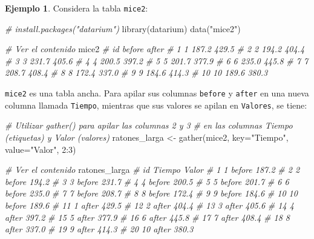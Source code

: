 \documentclass[
]{article}
\newenvironment{Shaded}{\begin{snugshade}}{\end{snugshade}}
\newcommand{\AttributeTok}[1]{\textcolor[rgb]{0.77,0.63,0.00}{#1}}
\newcommand{\CommentTok}[1]{\textcolor[rgb]{0.56,0.35,0.01}{\textit{#1}}}
\newcommand{\DecValTok}[1]{\textcolor[rgb]{0.00,0.00,0.81}{#1}}
\newcommand{\FunctionTok}[1]{\textcolor[rgb]{0.00,0.00,0.00}{#1}}
\newcommand{\NormalTok}[1]{#1}
\newcommand{\OtherTok}[1]{\textcolor[rgb]{0.56,0.35,0.01}{#1}}
\newcommand{\SpecialCharTok}[1]{\textcolor[rgb]{0.00,0.00,0.00}{#1}}
\newcommand{\StringTok}[1]{\textcolor[rgb]{0.31,0.60,0.02}{#1}}
\theoremstyle{definition}
\theoremstyle{definition}
\newtheorem{example}{Ejemplo}[section]
\theoremstyle{definition}
\theoremstyle{definition}
\theoremstyle{remark}
\begin{document}
\begin{example}

Considera la tabla \texttt{mice2}:

\begin{Shaded}
\begin{Highlighting}[]
\CommentTok{\# install.packages("datarium")}
\FunctionTok{library}\NormalTok{(datarium)}
\FunctionTok{data}\NormalTok{(}\StringTok{"mice2"}\NormalTok{)}

\CommentTok{\# Ver el contenido}
\NormalTok{mice2}
\CommentTok{\#    id before after}
\CommentTok{\# 1   1  187.2 429.5}
\CommentTok{\# 2   2  194.2 404.4}
\CommentTok{\# 3   3  231.7 405.6}
\CommentTok{\# 4   4  200.5 397.2}
\CommentTok{\# 5   5  201.7 377.9}
\CommentTok{\# 6   6  235.0 445.8}
\CommentTok{\# 7   7  208.7 408.4}
\CommentTok{\# 8   8  172.4 337.0}
\CommentTok{\# 9   9  184.6 414.3}
\CommentTok{\# 10 10  189.6 380.3}
\end{Highlighting}
\end{Shaded}

\texttt{mice2} es una tabla ancha. Para apilar sus columnas \texttt{before} y \texttt{after} en una nueva columna llamada \texttt{Tiempo}, mientras que sus valores se apilan en \texttt{Valores}, se tiene:

\begin{Shaded}
\begin{Highlighting}[]
\CommentTok{\# Utilizar gather() para apilar las columnas 2 y 3}
\CommentTok{\# en las columnas Tiempo (etiquetas) y Valor (valores)}
\NormalTok{ratones\_larga }\OtherTok{\textless{}{-}} \FunctionTok{gather}\NormalTok{(mice2, }\AttributeTok{key=}\StringTok{"Tiempo"}\NormalTok{, }\AttributeTok{value=}\StringTok{"Valor"}\NormalTok{, }\DecValTok{2}\SpecialCharTok{:}\DecValTok{3}\NormalTok{)}

\CommentTok{\# Ver el contenido}
\NormalTok{ratones\_larga}
\CommentTok{\#    id Tiempo Valor}
\CommentTok{\# 1   1 before 187.2}
\CommentTok{\# 2   2 before 194.2}
\CommentTok{\# 3   3 before 231.7}
\CommentTok{\# 4   4 before 200.5}
\CommentTok{\# 5   5 before 201.7}
\CommentTok{\# 6   6 before 235.0}
\CommentTok{\# 7   7 before 208.7}
\CommentTok{\# 8   8 before 172.4}
\CommentTok{\# 9   9 before 184.6}
\CommentTok{\# 10 10 before 189.6}
\CommentTok{\# 11  1  after 429.5}
\CommentTok{\# 12  2  after 404.4}
\CommentTok{\# 13  3  after 405.6}
\CommentTok{\# 14  4  after 397.2}
\CommentTok{\# 15  5  after 377.9}
\CommentTok{\# 16  6  after 445.8}
\CommentTok{\# 17  7  after 408.4}
\CommentTok{\# 18  8  after 337.0}
\CommentTok{\# 19  9  after 414.3}
\CommentTok{\# 20 10  after 380.3}
\end{Highlighting}
\end{Shaded}

\end{example}
\end{document}
